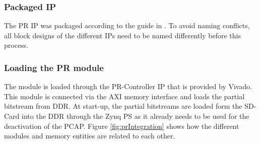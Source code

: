\subsubsection{Packaged IP}
The \gls{PR} IP was packaged according to the guide in \cite{xilinx_ug1118-vivado-creating-packaging-custom-ip.pdf_nodate}.
To avoid naming conflicts, all block designs of the different IPs need to be named differently before this process.
\subsubsection{Loading the \gls{PR} module}
The module is loaded through the \gls{PR}-Controller IP that is provided by Vivado. 
This module is connected via the AXI memory interface and loads the partial bitstream from DDR.
At start-up, the partial bitstreams are loaded form the SD-Card into the DDR through the Zynq \gls{PS} as it already needs to be used for the deactivation of the \gls{PCAP}.
Figure \ref{fig:prIntegration} shows how the different modules and memory entities are related to each other.